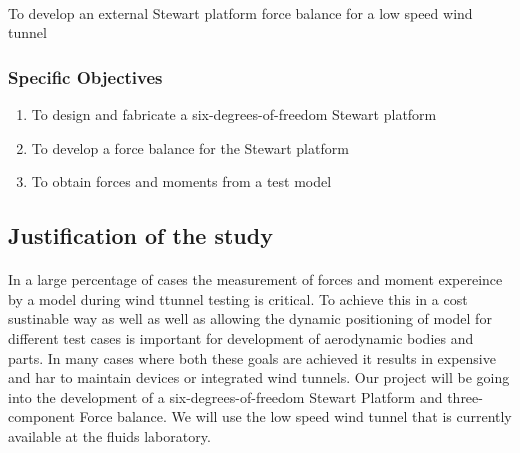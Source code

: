 \paragraph{} To develop an external Stewart platform force balance for a low speed wind tunnel 
\subsubsection{Specific Objectives}
\begin{enumerate}
\item To design and fabricate a six-degrees-of-freedom Stewart platform
\item To develop a force balance for the Stewart platform
\item To obtain forces and moments from a test model
\end{enumerate}
\subsection{Justification of the study}
\paragraph{} In a large percentage of cases the measurement of forces and moment expereince by a model during wind ttunnel testing is critical. To achieve this in a cost sustinable way as well as well as allowing the dynamic positioning of model for different test cases is important for development of aerodynamic bodies and parts. In many cases where both these goals are achieved it results in expensive and har to maintain devices or integrated wind tunnels. Our project will be going into the development of a six-degrees-of-freedom Stewart Platform and three-component Force balance. We will use the low speed wind tunnel that is currently available at the fluids laboratory.
